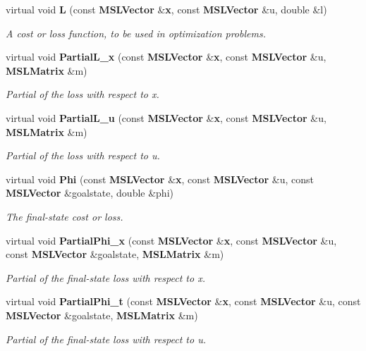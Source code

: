 \begin{CompactItemize}
virtual void {\bf L} (const {\bf MSLVector} \&{\bf x}, const {\bf MSLVector} \&u, double \&l)
\begin{CompactList}\small\item\em A cost or loss function, to be used in optimization problems.\item\end{CompactList}\item 
virtual void {\bf Partial\-L\_\-x} (const {\bf MSLVector} \&{\bf x}, const {\bf MSLVector} \&u, {\bf MSLMatrix} \&m)
\begin{CompactList}\small\item\em Partial of the loss with respect to x.\item\end{CompactList}\item 
virtual void {\bf Partial\-L\_\-u} (const {\bf MSLVector} \&{\bf x}, const {\bf MSLVector} \&u, {\bf MSLMatrix} \&m)
\begin{CompactList}\small\item\em Partial of the loss with respect to u.\item\end{CompactList}\item 
virtual void {\bf Phi} (const {\bf MSLVector} \&{\bf x}, const {\bf MSLVector} \&u, const {\bf MSLVector} \&goalstate, double \&phi)
\begin{CompactList}\small\item\em The final-state cost or loss.\item\end{CompactList}\item 
virtual void {\bf Partial\-Phi\_\-x} (const {\bf MSLVector} \&{\bf x}, const {\bf MSLVector} \&u, const {\bf MSLVector} \&goalstate, {\bf MSLMatrix} \&m)
\begin{CompactList}\small\item\em Partial of the final-state loss with respect to x.\item\end{CompactList}\item 
virtual void {\bf Partial\-Phi\_\-t} (const {\bf MSLVector} \&{\bf x}, const {\bf MSLVector} \&u, const {\bf MSLVector} \&goalstate, {\bf MSLMatrix} \&m)
\begin{CompactList}\small\item\em Partial of the final-state loss with respect to u.\item\end{CompactList}\item 

\end{CompactItemize}
